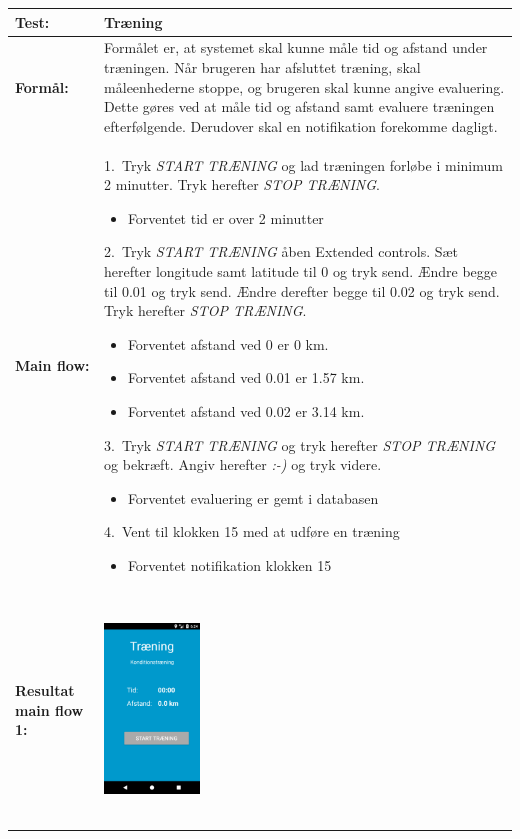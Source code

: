   \begin{longtable}{ | p{2cm} | p{13cm} |} \hline
    \textbf{Test:} & Træning \\ \hline
  \textbf{Formål:} & Formålet er, at systemet skal kunne måle tid og afstand under træningen. Når brugeren har afsluttet træning, skal måleenhederne stoppe, og brugeren skal kunne angive evaluering. Dette gøres ved at måle tid og afstand samt evaluere træningen efterfølgende. Derudover skal en notifikation forekomme dagligt.
 \\ \hline
 	\textbf{Main flow:} & 1.~Tryk \textit{START TRÆNING} og lad træningen forløbe i minimum 2 minutter. Tryk herefter \textit{STOP TRÆNING}.
 	\begin{itemize}
 	\item Forventet tid er over 2 minutter
 	\end{itemize}	
 	2.~Tryk \textit{START TRÆNING} åben Extended controls. Sæt herefter longitude samt latitude til 0 og tryk send. Ændre begge til 0.01 og tryk send. Ændre derefter begge til 0.02 og tryk send. Tryk herefter \textit{STOP TRÆNING}.
 	\begin{itemize}
 	\item Forventet afstand ved 0 er 0 km.
 	\item Forventet afstand ved 0.01 er 1.57 km.
 	\item Forventet afstand ved 0.02 er 3.14 km.
	\end{itemize}
  3.~Tryk \textit{START TRÆNING} og tryk herefter \textit{STOP TRÆNING} og 	bekræft. Angiv herefter \textit{:-)} og tryk videre.
  \begin{itemize}
  \item Forventet evaluering er gemt i databasen
  \end{itemize}
   4.~Vent til klokken 15 med at udføre en træning
  \begin{itemize}
  \item Forventet notifikation klokken 15
  \vspace{1mm}
  \end{itemize}
\\ \hline
\textbf{Resultat main flow 1:} &\hspace{1.5mm}
    \raisebox{-\totalheight}    {\includegraphics[width=0.24\textwidth, height=60mm]{figures/test/traening2}} 

\end{longtable}
